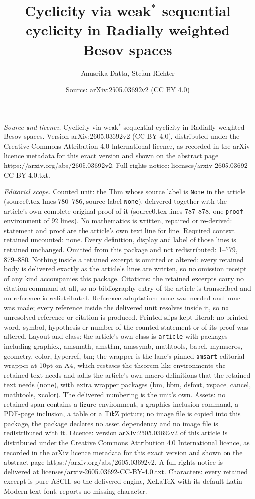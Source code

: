 \documentclass[10pt,a4paper]{amsart}
\title[Cyclicity via weak$^\ast$ sequential cyclicity in Radially w]{Cyclicity via weak$^\ast$ sequential cyclicity in Radially weighted Besov spaces}
\author{Anusrika Datta, Stefan Richter}
\date{Source: arXiv:2605.03692v2 (CC BY 4.0)}
\begin{document}
\maketitle

\noindent\emph{Source and licence.} Cyclicity via weak$^\ast$ sequential cyclicity in Radially weighted Besov spaces. Version arXiv:2605.03692v2 (CC BY 4.0), distributed under the Creative Commons Attribution 4.0 International licence, as recorded in the arXiv licence metadata for this exact version and shown on the abstract page https://arxiv.org/abs/2605.03692v2. Full rights notice: licenses/arxiv-2605.03692-CC-BY-4.0.txt.\par\smallskip

\noindent\textit{Editorial scope.} Counted unit: the Thm whose source label is \texttt{None} in the article (source0.tex lines 780--786, source label \texttt{None}), delivered together with the article's own complete original proof of it (source0.tex lines 787--878, one \texttt{proof} environment of 92 lines). No mathematics is written, repaired or re-derived: statement and proof are the article's own text line for line. Required context retained uncounted: none. Every definition, display and label of those lines is retained unchanged. Omitted from this package and not redistributed: 1--779, 879--880. Nothing inside a retained excerpt is omitted or altered: every retained body is delivered exactly as the article's lines are written, so no omission receipt of any kind accompanies this package. Citations: the retained excerpts carry no citation command at all, so no bibliography entry of the article is transcribed and no reference is redistributed. Reference adaptation: none was needed and none was made; every reference inside the delivered unit resolves inside it, so no unresolved reference or citation is produced. Printed slips kept literal: no printed word, symbol, hypothesis or number of the counted statement or of its proof was altered. Layout and class: the article's own class is \texttt{article} with packages including graphicx, amsmath, amsthm, amssymb, mathtools, babel, mymacros, geometry, color, hyperref, bm; the wrapper is the lane's pinned \texttt{amsart} editorial wrapper at 10pt on A4, which restates the theorem-like environments the retained text needs and adds the article's own macro definitions that the retained text needs (none), with extra wrapper packages (bm, bbm, dsfont, xspace, cancel, mathtools, xcolor). The delivered numbering is the unit's own. Assets: no retained span contains a figure environment, a graphics-inclusion command, a PDF-page inclusion, a table or a TikZ picture; no image file is copied into this package, the package declares no asset dependency and no image file is redistributed with it. Licence: version arXiv:2605.03692v2 of this article is distributed under the Creative Commons Attribution 4.0 International licence, as recorded in the arXiv licence metadata for this exact version and shown on the abstract page https://arxiv.org/abs/2605.03692v2. A full rights notice is delivered at licenses/arxiv-2605.03692-CC-BY-4.0.txt. Characters: every retained excerpt is pure ASCII, so the delivered engine, XeLaTeX with its default Latin Modern text font, reports no missing character.
\end{document}

